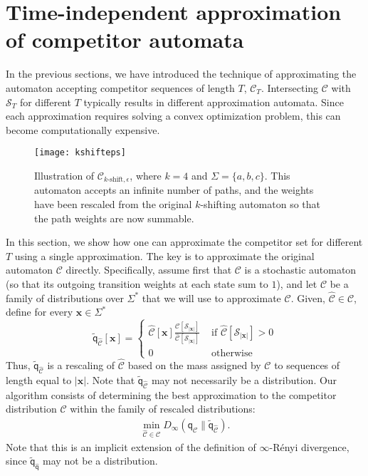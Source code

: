 \documentclass{article}
\newcommand{\sA}{\mathscr A}
\newcommand{\sC}{\mathscr C}
\newcommand{\sS}{\mathscr S}
\newcommand{\bx}{{\mathbf x}}
\newcommand{\sfp}{{\mathsf p}}
\newcommand{\sfq}{{\mathsf q}}
\newcommand{\cC}{\mathcal C}
\newcommand{\e}{\epsilon}
\begin{document}
\newpage
\section{Time-independent approximation of competitor automata}
\label{app:timeindepapprox}
In the previous sections, we have introduced the technique of approximating
the automaton accepting competitor sequences of length $T$, $\sC_T$.
Intersecting $\sC$ with $\sS_T$ for different $T$ typically results in
different approximation automata.  Since each approximation requires
solving a convex optimization problem, this can become computationally
expensive.

\begin{figure}[t]
  \centering
  \texttt{[image: kshifteps]} 
  \caption{Illustration of $\sC_{\text{$k$-shift},\e}$, where $k=4$ and $\Sigma=\{a,b,c\}$. 
  This automaton accepts an infinite number of paths, and the weights have been
  rescaled from the original $k$-shifting automaton so that the path weights 
  are now summable.}  \label{fig:kshifteps}
\end{figure}

In this section, we show how one can approximate the competitor set
for different $T$ using a single approximation. The key is to
approximate the original automaton $\sC$ directly. Specifically,
assume first that $\sC$ is a stochastic automaton (so that its
outgoing transition weights at each state sum to $1$), and let $\cC$
be a family of distributions over $\Sigma^*$ that we will use to
approximate $\sC$. Given, $\widehat{\sC} \in \cC$, define for every
$\bx \in \Sigma^*$
\[
  \tilde{\sfq}_{\widehat{\sC}}[\bx] = 
  \begin{cases}
    \widehat{\sC}[\bx] \frac{\sC[\sS_{|\bx|}]}{\widehat{\sC}[\sS_{|\bx|}]} & \text{ if } \widehat{\sC}[\sS_{|\bx|}] > 0 \\
    0 & \text{ otherwise }
  \end{cases} 
\]
Thus, $\tilde{\sfq}_{\widehat{\sC}}$ is a 
rescaling of $\widehat{\sC}$ based on the mass assigned by $\sC$ to sequences
of length equal to $|\bx|$.
Note that $\tilde{\sfq}_{\widehat{\sC}}$ may not necessarily be a 
distribution.  
Our algorithm consists of determining the 
best approximation to the competitor distribution  
$\sC$ within the family of rescaled distributions: 
\begin{align}
  \min_{\widehat{\sC}\in \cC} D_\infty(\sfq_\sC \| \tilde{\sfq}_{\widehat{\sC}}).
\end{align}
Note that this is an implicit extension of the definition of 
$\infty$-R\'{e}nyi divergence,
since $\tilde{\sfq}_{\widehat{\sfq}}$ may not be a distribution. 
\end{document}
